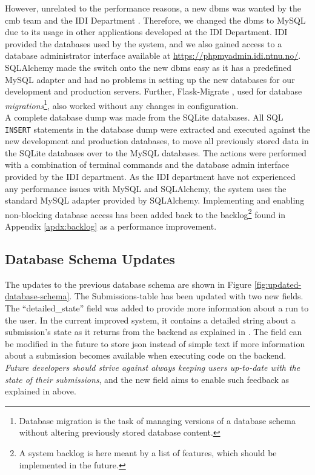 However, unrelated to the performance reasons, a new \gls{dbms} was wanted by the \gls{cmb} team and the IDI Department \cite{IDI}. Therefore, we changed the \gls{dbms} to MySQL due to its usage in other applications developed at the IDI Department. IDI provided the databases used by the system, and we also gained access to a database administrator interface available at \url{https://phpmyadmin.idi.ntnu.no/}. SQLAlchemy made the switch onto the new \gls{dbms} easy as it has a predefined MySQL adapter and had no problems in setting up the new databases for our development and production servers. Further, Flask-Migrate \cite{FLASKMIGRATE}, used for database \textit{migrations}\footnote{Database migration is the task of managing versions of a database schema without altering previously stored database content.}, also worked without any changes in configuration. \\

A complete database dump was made from the SQLite databases. All SQL \texttt{INSERT} statements in the database dump were extracted and executed against the new development and production databases, to move all previously stored data in the SQLite databases over to the MySQL databases. The actions were performed with a combination of terminal commands and the database admin interface provided by the IDI department. As the IDI department have not experienced any performance issues with MySQL and SQLAlchemy, the system uses the standard MySQL adapter provided by SQLAlchemy. Implementing and enabling non-blocking database access has been added back to the backlog\footnote{A system backlog is here meant by a list of features, which should be implemented in the future.} found in Appendix \ref{apdx:backlog} as a performance improvement.

\subsection{Database Schema Updates}
\label{subsec:impr-database}
The updates to the previous database schema are shown in Figure \ref{fig:updated-database-schema}. The Submissions-table has been updated with two new fields. The ``detailed\_state'' field was added to provide more information about a run to the user. In the current improved system, it contains a detailed string about a submission's state as it returns from the backend as explained in . The field can be modified in the future to store \gls{json} instead of simple text if more information about a submission becomes available when executing code on the backend. \textit{Future developers should strive against always keeping users up-to-date with the state of their submissions}, and the new field aims to enable such feedback as explained in  above. \\

